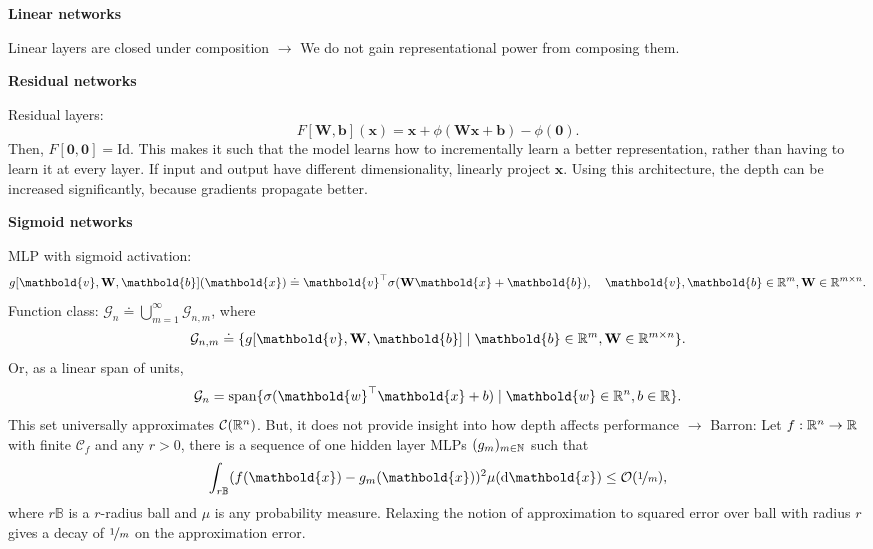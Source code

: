 \documentclass[10pt]{article}
\newenvironment{topic}[1]
{\textbf{\sffamily \footnotesize \colorbox{black}{\rlap{\textbf{\textcolor{white}{#1}}}\hspace{\linewidth}\hspace{-2\fboxsep}}}}
{}
\newenvironment{subtopic}[1]
{\vspace{0.1cm} \begin{center}\textbf{\footnotesize \sffamily #1}\end{center}}
{}
\renewcommand{\mat}[1]{\ensuremath{\mathbf{#1}}}
\renewcommand{\vec}[1]{\ensuremath{\mathbold{#1}}}
\begin{document}
\begin{multicols*}{3}
\begin{topic}{Feedforward networks}
        \begin{subtopic}{Linear networks}
            Linear layers are closed under composition $\to$ We do not gain representational power from composing them.
        \end{subtopic}

        \begin{subtopic}{Residual networks}
            Residual layers: \[
                F[\mat{W},\vec{b}](\vec{x}) = \vec{x} + \phi(\mat{W}\vec{x} + \vec{b}) - \phi(\vec{0}).
            \]
            Then, $F[\vec{0}, \vec{0}] = \mathrm{Id}$. This makes it such that the model learns how to
            incrementally learn a better representation, rather than having to learn it at every layer. If
            input and output have different dimensionality, linearly project $\vec{x}$. Using this
            architecture, the depth can be increased significantly, because gradients propagate better.
        \end{subtopic}

        \begin{subtopic}{Sigmoid networks}
            MLP with sigmoid activation: \[
                g[\vec{v}, \mat{W}, \vec{b}](\vec{x}) \doteq \transpose{\vec{v}} \sigma(\mat{W}\vec{x}+\vec{b}), \quad \vec{v},\vec{b}\in\R^m, \mat{W}\in\R^{m\times n}.
            \]
            Function class: $\mathcal{G}_n \doteq \bigcup_{m=1}^{\infty} \mathcal{G}_{n,m}$, where \[
                \mathcal{G}_{n,m} \doteq \{ g[\vec{v},\mat{W},\vec{b}] \mid \vec{b}\in\R^m, \mat{W}\in\R^{m\times n} \}.
            \]
            Or, as a linear span of units, \[
                \mathcal{G}_{n} = \mathrm{span} \{ \sigma(\transpose{\vec{w}}\vec{x} + b) \mid \vec{w} \in \R^n, b \in \R \}.
            \]
            This set universally approximates $\mathcal{C}(\mathbb{R}^n)$. But, it does not provide insight into how
            depth affects performance $\to$ Barron: Let $f: \mathbb{R}^n \to \mathbb{R}$ with finite $\mathcal{C}_f$ and any $r
                > 0$, there is a sequence of one hidden layer MLPs $(g_m)_{m \in \mathbb{N}}$ such that \[
                \int_{r \mathbb{B}} (f(\vec{x}) - g_m(\vec{x}))^2 \mu(\mathrm{d}\vec{x}) \leq \bigo{\nicefrac{1}{m}},
            \]
            where $r\mathbb{B}$ is a $r$-radius ball and $\mu$ is any probability measure. Relaxing the notion
            of approximation to squared error over ball with radius $r$ gives a decay of $\nicefrac{1}{m}$ on
            the approximation error.
        \end{subtopic}


\end{topic}
\end{multicols*}
\end{document}
